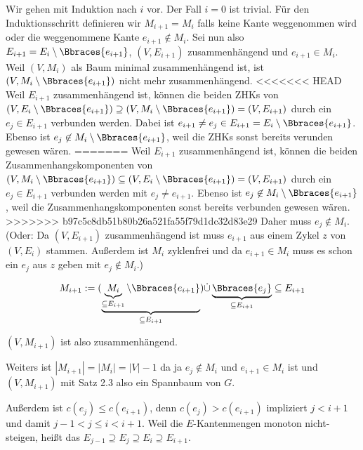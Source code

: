 \begin{solution}
\begin{enumerate}[label = (\Alph*)]
    Wir gehen mit Induktion nach $i$ vor.
    Der Fall $i = 0$ ist trivial.
    Für den Induktionsschritt definieren wir $M_{i+1} = M_i$ falls keine Kante weggenommen wird oder die weggenommene Kante $e_{i+1} \not \in M_i$.
    Sei nun also $E_{i+1} = E_i \setminus \Bbraces{e_{i+1}}$, $(V, E_{i+1})$ zusammenhängend und $e_{i+1} \in M_i$.
    Weil $(V, M_i)$ als Baum minimal zusammenhängend ist, ist $(V, M_i \setminus \Bbraces{e_{i+1}})$ nicht mehr zusammenhängend.
<<<<<<< HEAD
    Weil $E_{i+1}$ zusammenhängend ist, können die beiden ZHKs von $(V, E_i \setminus \Bbraces{e_{i+1}}) \supseteq (V, M_i \setminus \Bbraces{e_{i+1}}) = (V, E_{i+1})$ durch ein $e_j \in E_{i+1}$ verbunden werden. 
    Dabei ist $e_{i+1} \neq e_j \in E_{i+1} = E_i \setminus \Bbraces{e_{i+1}}$.
    Ebenso ist $e_j \not \in M_i \setminus \Bbraces{e_{i+1}}$, weil die ZHKs sonst bereits verunden gewesen wären.
=======
    Weil $E_{i+1}$ zusammenhängend ist, können die beiden Zusammenhangskomponenten von
    $(V, M_i \setminus \Bbraces{e_{i+1}}) \subseteq (V, E_i \setminus \Bbraces{e_{i+1}}) = (V, E_{i+1})$
    durch ein $e_j \in E_{i+1}$ verbunden werden mit $e_j \neq e_{i+1}$.
    Ebenso ist $e_j \not \in M_i \setminus \Bbraces{e_{i+1}}$, weil die Zusammenhangskomponenten sonst bereits verbunden gewesen wären.
>>>>>>> b97c5c8db51b80b26a521fa55f79d1dc32d83e29
    Daher muss $e_j \not \in M_i$. (Oder: Da $(V,E_{i + 1})$ zusammenhängend ist muss $e_{i + 1}$ aus einem Zykel $z$ von $(V,E_i)$ stammen. Außerdem ist $M_i$ zyklenfrei und da $e_{i + 1} \in M_i$ muss es schon ein $e_j$ aus $z$ geben mit $e_j \notin M_i$.)

    \begin{align*}
        M_{i+1}
        :=
        (
            \underbrace
            {
                \underbrace{M_i}_{\subseteq E_{i+1}}
                \setminus
                \Bbraces{e_{i+1}}
            }_{
                \subseteq E_{i+1}
            }
        )
        \dot \cup
        \underbrace
        {
            \Bbraces{e_j}
        }_{
            \subseteq E_{i+1}
        }
        \subseteq
        E_{i+1}
    \end{align*}

    $(V, M_{i+1})$ ist also zusammenhängend.

    Weiters ist $|M_{i+1}| = |M_i| = |V| - 1$ da ja $e_j \notin M_i$ und $e_{i+1} \in M_i$ ist und $(V, M_{i+1})$ mit Satz 2.3 also ein Spannbaum von $G$.

    Außerdem ist $c(e_j) \leq c(e_{i+1})$, denn $c(e_j) > c(e_{i+1})$ impliziert $j < i + 1$ und damit $j-1 < j \leq i < i+1$.
    Weil die $E$-Kantenmengen monoton nicht-steigen, heißt das $E_{j-1} \supseteq E_j \supseteq E_i \supseteq E_{i+1}$.


\end{enumerate}
\end{solution}
